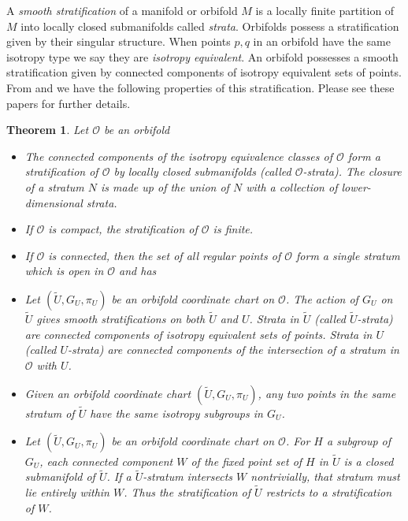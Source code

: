 \documentclass{amsart}
\theoremstyle{plain}
\newtheorem{theorem}[thm]{Theorem}
\theoremstyle{definition}
\theoremstyle{remark}
\newcommand{\wtu}{\widetilde{U}}
\newcommand{\orb}{\mathcal O}
\newcommand{\cc}{(\widetilde{U}, G_U, \pi_U)}
\begin{document}
 A \emph{smooth stratification} of a manifold or orbifold $M$ is a locally finite partition of $M$ into locally closed submanifolds called \emph{strata}.  Orbifolds possess a stratification given by their singular structure.  When points $p,q$ in an orbifold have the same isotropy type we say they are \emph{isotropy equivalent}.  An orbifold possesses a smooth stratification given by connected components of isotropy equivalent sets of points.  From \cite[Theorem 1.24]{gordon12} and \cite[Proposition 2.13]{dggw} we have the following properties of this stratification.  Please see these papers for further details.

 \begin{theorem}\label{stratification} Let $\orb$ be an orbifold 
\begin{itemize}
\item[a.]  The connected components of the isotropy equivalence classes of $\orb$ form a stratification of $\orb$ by locally closed submanifolds (called \emph{$\orb$-strata}).  The closure of a stratum $N$ is made up of the union of $N$ with a collection of lower-dimensional strata.  
\item[b.] If $\orb$ is compact, the stratification of $\orb$ is finite.
\item[c.] If $\orb$ is connected, then the set of all regular points of
    $\orb$ form a single stratum which is open in $\orb$ and has 
\item[d.] Let $\cc$ be an orbifold coordinate chart on $\orb$.  The action of $G_U$ on $\wtu$ gives smooth stratifications on both $\wtu$ and $U$. Strata in $\wtu$ (called \emph{$\wtu$-strata}) are connected components of isotropy equivalent sets of points. Strata in $U$ (called \emph{$U$-strata}) are connected components of the intersection of a stratum in $\orb$ with $U$.  
\item[e.] Given an orbifold coordinate chart $\cc$, any two points in the same stratum of $\wtu$ have the same isotropy subgroups in $G_U$. 
\item[f.] Let $\cc$ be an orbifold coordinate chart on $\orb$.  For $H$ a subgroup of $G_U$, each connected component $W$ of the fixed point set of $H$ in $\wtu$ is a closed submanifold of $\wtu$.  If a $\wtu$-stratum intersects $W$ nontrivially, that stratum must lie entirely within $W$. Thus the stratification of $\wtu$ restricts to a stratification of $W$.
\end{itemize}
\end{theorem}
\end{document}
